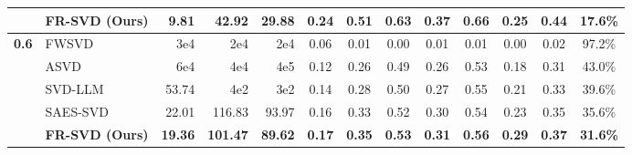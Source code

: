 \begin{table}[t]
{\begin{tabular}{l l
                r r r |
                c c c c c c
                c c}
\rowcolor{gray!12}
 & \textbf{FR-SVD (Ours)}         & \textbf{9.81} & \textbf{42.92} & \textbf{29.88} & \textbf{0.24} & \textbf{0.51} & \textbf{0.63} & \textbf{0.37} & \textbf{0.66} & \textbf{0.25} & \textbf{0.44} & \textbf{17.6\%} \\
\midrule
\multirow{5}{*}{\textbf{0.6}}
 & FWSVD                          & 3e4   & 2e4   & 2e4   & 0.06 & 0.01 & 0.00 & 0.01 & 0.01 & 0.00 & 0.02 & 97.2\% \\
 & ASVD                            & 6e4   & 4e4   & 4e5   & 0.12 & 0.26 & 0.49 & 0.26 & 0.53 & 0.18 & 0.31 & 43.0\% \\
 & SVD-LLM                         & 53.74 & 4e2   & 3e2   & 0.14 & 0.28 & 0.50 & 0.27 & 0.55 & 0.21 & 0.33 & 39.6\% \\
 & SAES-SVD                        & 22.01 & 116.83 & 93.97 & 0.16 & 0.33 & 0.52 & 0.30 & 0.54 & 0.23 & 0.35 & 35.6\% \\
\rowcolor{gray!12}
 & \textbf{FR-SVD (Ours)}         & \textbf{19.36} & \textbf{101.47} & \textbf{89.62} & \textbf{0.17} & \textbf{0.35} & \textbf{0.53} & \textbf{0.31} & \textbf{0.56} & \textbf{0.29} & \textbf{0.37} & \textbf{31.6\%} \\
\bottomrule
\end{tabular}%
}
\end{table}
